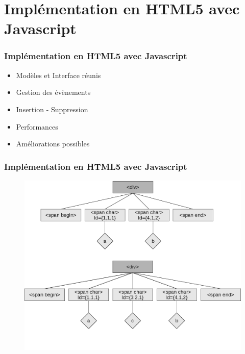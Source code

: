 \section{Implémentation en HTML5 avec Javascript}
  \begin{frame}
    \frametitle{Implémentation en HTML5 avec Javascript}
    \begin{itemize}
      \item Modèles et Interface réunis
      \item<2-> Gestion des évènements
      \item<3-> Insertion - Suppression
      \item<4-> Performances
      \item<5-> Améliorations possibles
    \end{itemize}
  \end{frame}
  
  \begin{frame}
    \frametitle{Implémentation en HTML5 avec Javascript}
	  \begin{figure}
		\center
		\includegraphics[scale=0.30]{insertionhtml}
	  \end{figure}
  \end{frame}

